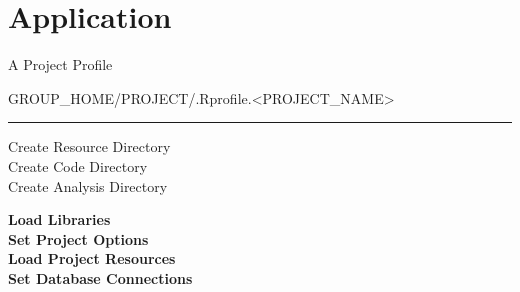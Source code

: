 \documentclass{beamer}
\begin{document}
\section*{Application}

\begin{frame}{A Project Profile}

\begin{center} GROUP\_HOME/PROJECT/.Rprofile.<PROJECT\_NAME>\\ \end{center}
\begin{center}
\rule{4cm}{0.6pt}
\end{center}

\begin{center}
Create Resource Directory\\
Create Code Directory \\ 
Create Analysis Directory\\
\end{center}

\textbf{Load Libraries\\}
\textbf{Set Project Options\\}
\textbf{Load Project Resources\\}
\textbf{Set Database Connections\\}

\end{frame}
\end{document}
